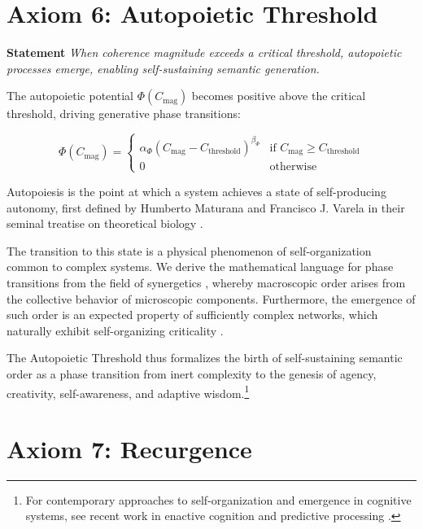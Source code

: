\section{Axiom 6: Autopoietic Threshold}
\label{1.6:axiom_6_autopoietic_threshold}

\textbf{Statement} \textit{When coherence magnitude exceeds a critical threshold, autopoietic processes emerge, enabling self-sustaining semantic generation.}

The autopoietic potential \(\Phi(C_{\text{mag}})\) becomes positive above the critical threshold, driving generative phase transitions:

\begin{equation}
\Phi(C_{\text{mag}}) = \begin{cases}
\alpha_{\Phi} (C_{\text{mag}} - C_{\text{threshold}})^{\beta_{\Phi}} & \text{if } C_{\text{mag}} \geq C_{\text{threshold}} \\
0 & \text{otherwise}
\end{cases}
\end{equation}

Autopoiesis is the point at which a system achieves a state of self-producing autonomy, first defined by Humberto Maturana and Francisco J. Varela in their seminal treatise on theoretical biology \autocite{MaturanaVarela1980}.

The transition to this state is a physical phenomenon of self-organization common to complex systems. We derive the mathematical language for phase transitions from the field of synergetics \autocite{Haken1983}, whereby macroscopic order arises from the collective behavior of microscopic components. Furthermore, the emergence of such order is an expected property of sufficiently complex networks, which naturally exhibit self-organizing criticality \autocite{BakTangWiesenfeld1987}.

The Autopoietic Threshold thus formalizes the birth of self-sustaining semantic order as a phase transition from inert complexity to the genesis of agency, creativity, self-awareness, and adaptive wisdom.\footnote{For contemporary approaches to self-organization and emergence in cognitive systems, see recent work in enactive cognition \autocite{Thompson2018, DiPaolo2021} and predictive processing \autocite{Clark2016, Hohwy2013}.}


\section{Axiom 7: Recurgence}
\label{1.7:axiom_7_recurgence}

